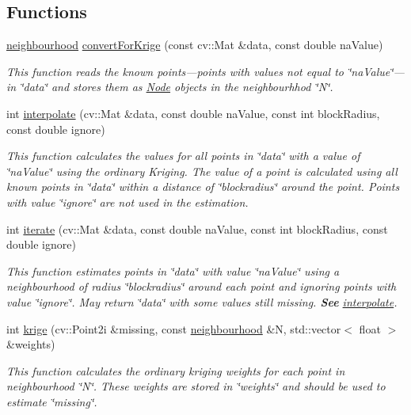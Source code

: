 \subsection*{Functions}
\begin{DoxyCompactItemize}
\item 
\hyperlink{classkrige__ce_1_1neighbourhood}{neighbourhood} \hyperlink{namespacekrige__ce_a861d4c1c299c2a804f97da659a07da9b}{convert\+For\+Krige} (const cv\+::\+Mat \&data, const double na\+Value)
\begin{DoxyCompactList}\small\item\em This function reads the known points---points with values not equal to \char`\"{}na\+Value\char`\"{}---in \char`\"{}data\char`\"{} and stores them as \hyperlink{classkrige__ce_1_1Node}{Node} objects in the neighbourhhod \char`\"{}\+N\char`\"{}. \end{DoxyCompactList}\item 
int \hyperlink{namespacekrige__ce_a2baf63b9ce686bca1b18e20e15327b17}{interpolate} (cv\+::\+Mat \&data, const double na\+Value, const int block\+Radius, const double ignore)
\begin{DoxyCompactList}\small\item\em This function calculates the values for all points in \char`\"{}data\char`\"{} with a value of \char`\"{}na\+Value\char`\"{} using the ordinary Kriging. The value of a point is calculated using all known points in \char`\"{}data\char`\"{} within a distance of \char`\"{}blockradius\char`\"{} around the point. Points with value \char`\"{}ignore\char`\"{} are not used in the estimation. \end{DoxyCompactList}\item 
int \hyperlink{namespacekrige__ce_a081786b8ed441ac7fc83c31a51c98012}{iterate} (cv\+::\+Mat \&data, const double na\+Value, const int block\+Radius, const double ignore)
\begin{DoxyCompactList}\small\item\em This function estimates points in \char`\"{}data\char`\"{} with value \char`\"{}na\+Value\char`\"{} using a neighbourhood of radius \char`\"{}blockradius\char`\"{} around each point and ignoring points with value \char`\"{}ignore\char`\"{}. May return \char`\"{}data\char`\"{} with some values still missing. {\bfseries See} \hyperlink{namespacekrige__ce_a2baf63b9ce686bca1b18e20e15327b17}{interpolate}. \end{DoxyCompactList}\item 
int \hyperlink{namespacekrige__ce_a4b3240fe905c7bb2f9b7435eb32c9a22}{krige} (cv\+::\+Point2i \&missing, const \hyperlink{classkrige__ce_1_1neighbourhood}{neighbourhood} \&N, std\+::vector$<$ float $>$ \&weights)
\begin{DoxyCompactList}\small\item\em This function calculates the ordinary kriging weights for each point in neighbourhood \char`\"{}\+N\char`\"{}. These weights are stored in \char`\"{}weights\char`\"{} and should be used to estimate \char`\"{}missing\char`\"{}. \end{DoxyCompactList}\end{DoxyCompactItemize}


